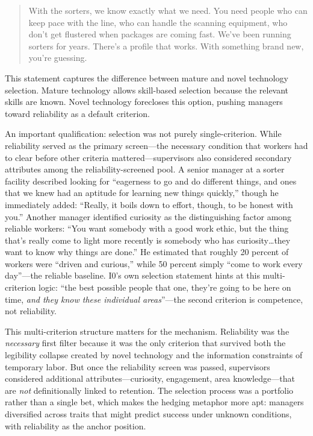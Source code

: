 \documentclass[12pt]{article}
\begin{document}
\begin{quote}
With the sorters, we know exactly what we need. You need people who can keep pace with the line, who can handle the scanning equipment, who don't get flustered when packages are coming fast. We've been running sorters for years. There's a profile that works. With something brand new, you're guessing.
\end{quote}

This statement captures the difference between mature and novel technology selection. Mature technology allows skill-based selection because the relevant skills are known. Novel technology forecloses this option, pushing managers toward reliability as a default criterion.

An important qualification: selection was not purely single-criterion. While reliability served as the primary screen---the necessary condition that workers had to clear before other criteria mattered---supervisors also considered secondary attributes among the reliability-screened pool. A senior manager at a sorter facility described looking for ``eagerness to go and do different things, and ones that we knew had an aptitude for learning new things quickly,'' though he immediately added: ``Really, it boils down to effort, though, to be honest with you.'' Another manager identified curiosity as the distinguishing factor among reliable workers: ``You want somebody with a good work ethic, but the thing that's really come to light more recently is somebody who has curiosity\ldots they want to know why things are done.'' He estimated that roughly 20 percent of workers were ``driven and curious,'' while 50 percent simply ``come to work every day''---the reliable baseline. I0's own selection statement hints at this multi-criterion logic: ``the best possible people that one, they're going to be here on time, \textit{and they know these individual areas}''---the second criterion is competence, not reliability.

This multi-criterion structure matters for the mechanism. Reliability was the \textit{necessary} first filter because it was the only criterion that survived both the legibility collapse created by novel technology and the information constraints of temporary labor. But once the reliability screen was passed, supervisors considered additional attributes---curiosity, engagement, area knowledge---that are \textit{not} definitionally linked to retention. The selection process was a portfolio rather than a single bet, which makes the hedging metaphor more apt: managers diversified across traits that might predict success under unknown conditions, with reliability as the anchor position.
\end{document}
